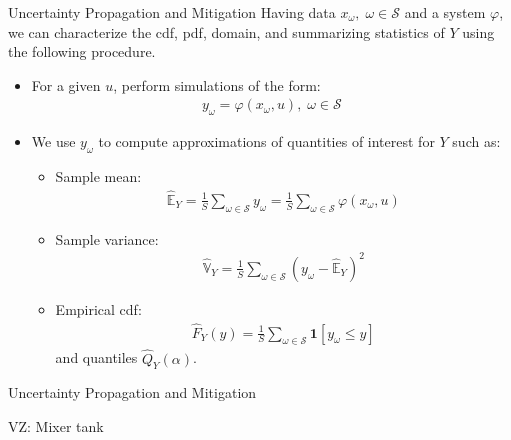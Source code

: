\documentclass[9pt]{beamer}
\begin{document}
%
\begin{frame}{Uncertainty Propagation and Mitigation}
Having data $x_\omega,\; \omega \in \mathcal{S}$ and a system $\varphi$, we can characterize the cdf, pdf, domain, and summarizing statistics of $Y$ using the following procedure. 
\begin{block}{}
\begin{itemize}
\item For a given $u$, perform simulations of the form:
\begin{align*}
y_\omega=\varphi(x_\omega,u),\; \omega \in \mathcal{S}
\end{align*} 
\item We use $y_\omega$ to compute approximations of quantities of interest for $Y$ such as:
\begin{itemize}
\item Sample mean:
\begin{align*}
 \hat{\mathbb{E}}_Y=\frac{1}{S}\sum_{\omega \in \mathcal{S}}y_\omega=\frac{1}{S}\sum_{\omega \in \mathcal{S}}\varphi(x_\omega,u)
 \end{align*}
\item Sample variance: 
\begin{align*}
\hat{\mathbb{V}}_Y=\frac{1}{S}\sum_{\omega \in \mathcal{S}}(y_\omega-\hat{\mathbb{E}}_Y)^2
\end{align*} 
\item Empirical cdf: 
\begin{align*}
\hat{F}_Y(y)=\frac{1}{S}\sum_{\omega \in \mathcal{S}}\mathbf{1}[y_\omega \leq y] 
\end{align*}
and quantiles $\hat{Q}_Y(\alpha)$.
\end{itemize}
\end{itemize}
\end{block}
\end{frame}

%
\begin{frame}{Uncertainty Propagation and Mitigation}
\begin{block}{}
{\color{red} VZ:} Mixer tank
\end{block}
\end{frame}
\end{document}
